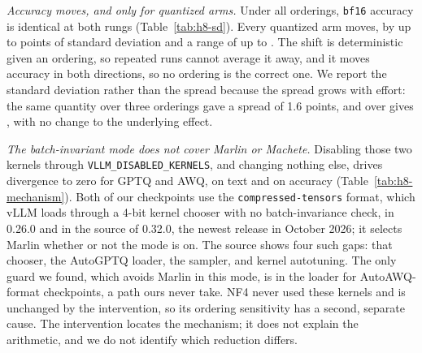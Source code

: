 \documentclass[conference]{IEEEtran}
\begin{document}
\begin{table}[t]
\centering
\caption{Accuracy across \hEightSDOrderings{} orderings of the same \hEightItems{} items
(Qwen2.5-3B, L40S, $B=\hEightSDLevel$), in accuracy points. The standard deviation is the
inferential quantity; the range grows with the number of orderings.}
\label{tab:h8-sd}
\small

\end{table}

\emph{Accuracy moves, and only for quantized arms.} Under all \hEightSDOrderings{} orderings,
\texttt{bf16} accuracy is identical at both rungs (Table~\ref{tab:h8-sd}). Every quantized arm
moves, by up to \hEightWorstSDTen{} points of standard deviation and a range of up to
\hEightRangeTen{}. The shift is deterministic given an ordering, so repeated runs cannot
average it away, and it moves accuracy in both directions, so no ordering is the correct one.
We report the standard deviation rather than the spread because the spread grows with effort:
the same quantity over three orderings gave a spread of 1.6 points, and over
\hEightSDOrderings{} gives \hEightRangeTen{}, with no change to the underlying effect.

\begin{table}[t]
\centering
\caption{Paired intervention at $B=8$: the same inputs and engine with and without the Marlin
and Machete kernels. Text divergence in percent, accuracy SD in points.}
\label{tab:h8-mechanism}
\small

\end{table}

\begin{table}[t]
\centering
\caption{Order-induced divergence, in percent of items, at three measurement levels (generated
text, and correctness under strict and permissive extraction) by served batch size $B$, on
\hEightItems{} items with \hEightOrderings{} orderings (Qwen2.5-3B, L40S). Which batch size
is safe differs by arm.}
\label{tab:h8-frontier}
\small

\end{table}

\emph{The batch-invariant mode does not cover Marlin or Machete.} Disabling those two kernels
through \texttt{VLLM\_DISABLED\_KERNELS}, and changing nothing else, drives divergence to zero
for GPTQ and AWQ, on text and on accuracy (Table~\ref{tab:h8-mechanism}). Both of our
checkpoints use the \texttt{compressed-tensors} format, which vLLM loads through a 4-bit
kernel chooser with no batch-invariance check, in 0.26.0 and in the source of 0.32.0, the
newest release in October 2026; it selects Marlin whether or not the mode is on. The source
shows four such gaps: that chooser, the AutoGPTQ loader, the sampler, and kernel autotuning.
The only guard we found, which avoids Marlin in this mode, is in the loader for AutoAWQ-format
checkpoints, a path ours never take. NF4 never
used these kernels and is unchanged by the intervention, so its ordering sensitivity has a
second, separate cause. The intervention locates the mechanism; it does not explain the
arithmetic, and we do not identify which reduction differs.
\end{document}
